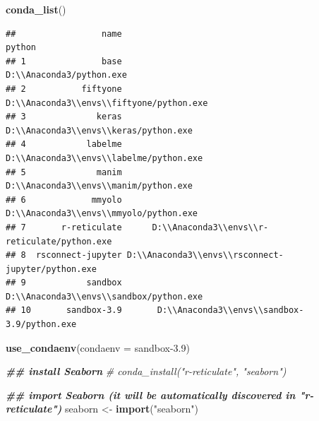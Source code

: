 \documentclass[
]{book}
\newenvironment{Shaded}{\begin{snugshade}}{\end{snugshade}}
\newcommand{\AttributeTok}[1]{\textcolor[rgb]{0.13,0.29,0.53}{#1}}
\newcommand{\CommentTok}[1]{\textcolor[rgb]{0.56,0.35,0.01}{\textit{#1}}}
\newcommand{\DocumentationTok}[1]{\textcolor[rgb]{0.56,0.35,0.01}{\textbf{\textit{#1}}}}
\newcommand{\FunctionTok}[1]{\textcolor[rgb]{0.13,0.29,0.53}{\textbf{#1}}}
\newcommand{\NormalTok}[1]{#1}
\newcommand{\OtherTok}[1]{\textcolor[rgb]{0.56,0.35,0.01}{#1}}
\newcommand{\StringTok}[1]{\textcolor[rgb]{0.31,0.60,0.02}{#1}}
\theoremstyle{definition}
\theoremstyle{definition}
\theoremstyle{definition}
\theoremstyle{definition}
\theoremstyle{remark}
\begin{document}
\begin{Shaded}
\begin{Highlighting}[]
\FunctionTok{conda\_list}\NormalTok{()}
\end{Highlighting}
\end{Shaded}

\begin{verbatim}
##                 name                                            python
## 1               base                          D:\\Anaconda3/python.exe
## 2           fiftyone          D:\\Anaconda3\\envs\\fiftyone/python.exe
## 3              keras             D:\\Anaconda3\\envs\\keras/python.exe
## 4            labelme           D:\\Anaconda3\\envs\\labelme/python.exe
## 5              manim             D:\\Anaconda3\\envs\\manim/python.exe
## 6             mmyolo            D:\\Anaconda3\\envs\\mmyolo/python.exe
## 7       r-reticulate      D:\\Anaconda3\\envs\\r-reticulate/python.exe
## 8  rsconnect-jupyter D:\\Anaconda3\\envs\\rsconnect-jupyter/python.exe
## 9            sandbox           D:\\Anaconda3\\envs\\sandbox/python.exe
## 10       sandbox-3.9       D:\\Anaconda3\\envs\\sandbox-3.9/python.exe
\end{verbatim}

\begin{Shaded}
\begin{Highlighting}[]
\FunctionTok{use\_condaenv}\NormalTok{(}\AttributeTok{condaenv =} \StringTok{\textquotesingle{}sandbox{-}3.9\textquotesingle{}}\NormalTok{)}

\DocumentationTok{\#\# install Seaborn}
\CommentTok{\# conda\_install("r{-}reticulate", "seaborn")}

\DocumentationTok{\#\# import Seaborn (it will be automatically discovered in "r{-}reticulate")}
\NormalTok{seaborn }\OtherTok{\textless{}{-}} \FunctionTok{import}\NormalTok{(}\StringTok{"seaborn"}\NormalTok{)}
\end{Highlighting}
\end{Shaded}
\end{document}
